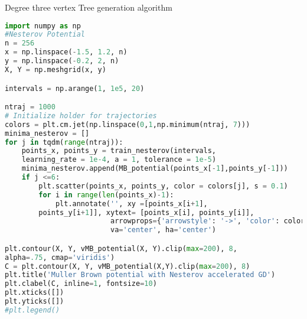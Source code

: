 \documentclass{article}
\begin{document}
\begin{codeblock}{Degree three vertex Tree generation algorithm}
\begin{lstlisting}[language=Python]
import numpy as np
#Nesterov Potential 
n = 256
x = np.linspace(-1.5, 1.2, n)
y = np.linspace(-0.2, 2, n)
X, Y = np.meshgrid(x, y)

intervals = np.arange(1, 1e5, 20)

ntraj = 1000
# Initialize holder for trajectories
colors = plt.cm.jet(np.linspace(0,1,np.minimum(ntraj, 7)))
minima_nesterov = []
for j in tqdm(range(ntraj)):
    points_x, points_y = train_nesterov(intervals,
    learning_rate = 1e-4, a = 1, tolerance = 1e-5)
    minima_nesterov.append(MB_potential(points_x[-1],points_y[-1]))
    if j <=6: 
        plt.scatter(points_x, points_y, color = colors[j], s = 0.1)
        for i in range(len(points_x)-1):
            plt.annotate('', xy =[points_x[i+1],
	    points_y[i+1]], xytext= [points_x[i], points_y[i]],
                         arrowprops={'arrowstyle': '->', 'color': colors[j],  'lw': 1},
                         va='center', ha='center')

plt.contour(X, Y, vMB_potential(X, Y).clip(max=200), 8,
alpha=.75, cmap='viridis')
C = plt.contour(X, Y, vMB_potential(X,Y).clip(max=200), 8)
plt.title('Muller Brown potential with Nesterov accelerated GD')
plt.clabel(C, inline=1, fontsize=10)
plt.xticks([])
plt.yticks([])
#plt.legend()    

\end{lstlisting}
    
\end{codeblock}
\end{document}
